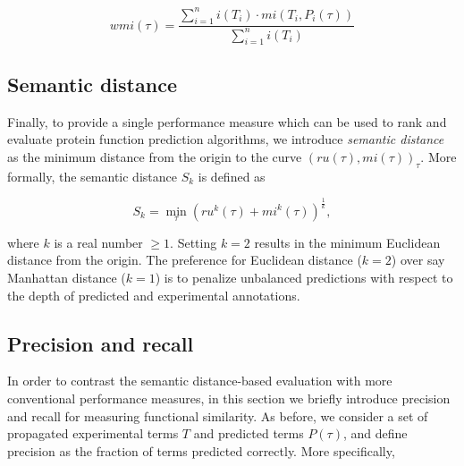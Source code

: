 \begin{equation}
wmi(\tau)=\frac{\sum_{i=1}^{n}i(T_{i})\cdot mi(T_{i},P_{i}(\tau))}{\sum_{i=1}^{n}i(T_{i})}
\label{eq:weighted_mi}
\end{equation}



\subsection{Semantic distance}

Finally, to provide a single performance measure which can be used to rank and evaluate protein function prediction algorithms, we introduce \emph{semantic distance} as the minimum distance from the origin to the curve $(ru(\tau),mi(\tau))_{\tau}$. More formally, the semantic distance $S_{k}$ is defined as

\begin{equation}
S_{k}=\underset{\tau}{\min}(ru^{k}(\tau)+mi^{k}(\tau))^{\frac{1}{k}},
\label{eq:semantic_distance}
\end{equation}

\noindent where $k$ is a real number $\ge 1$. Setting $k=2$ results in the minimum Euclidean distance from the origin. The preference for Euclidean distance ($k=2$) over say Manhattan distance ($k=1$) is to penalize unbalanced predictions with respect to the depth of predicted and experimental annotations. 


\subsection{Precision and recall}

In order to contrast the semantic distance-based evaluation with more conventional performance measures, in this section we briefly introduce precision and recall for measuring functional similarity. As before, we consider a set of propagated experimental terms $T$ and predicted terms $P(\tau)$, and define precision as the fraction of terms predicted correctly. More specifically, 

